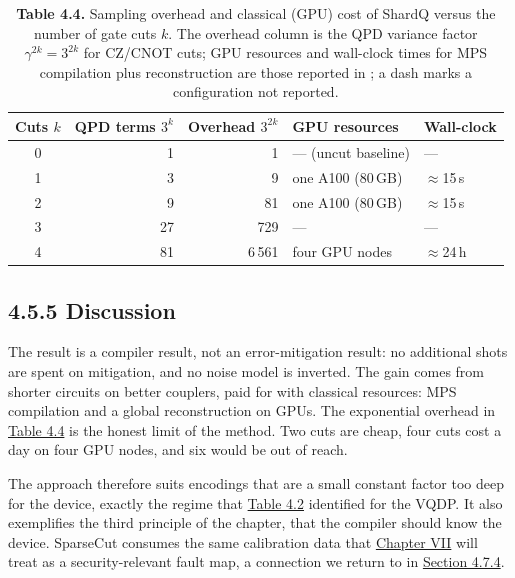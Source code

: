 \documentclass{report}
\theoremstyle{plain}
\theoremstyle{definition}
\theoremstyle{remark}
\begin{document}
\begin{table}[htbp]
\caption{\textbf{Table 4.4.} Sampling overhead and classical (GPU) cost of ShardQ versus the number of gate cuts $k$. The overhead column is the QPD variance factor $\gamma^{2k} = 3^{2k}$ for CZ/CNOT cuts; GPU resources and wall-clock times for MPS compilation plus reconstruction are those reported in \cite{guo2025shardq}; a dash marks a configuration not reported.}\label{tab:qml:shardq-overhead}
 
\small
\begin{tabular}{crrll}
\toprule
Cuts $k$ & QPD terms $3^{k}$ & Overhead $3^{2k}$ & GPU resources & Wall-clock \\
\midrule
0 & 1 & 1 & --- (uncut baseline) & --- \\
1 & 3 & 9 & one A100 (80 GB) & $\approx$15 s \\
2 & 9 & 81 & one A100 (80 GB) & $\approx$15 s \\
3 & 27 & 729 & --- & --- \\
4 & 81 & 6\,561 & four GPU nodes & $\approx$24 h \\
\bottomrule
\end{tabular}
\end{table}

\subsection{4.5.5 Discussion}\label{sec:qml:shardq:discussion}

The result is a compiler result, not an error-mitigation result: no additional shots are spent on mitigation, and no noise model is inverted. The gain comes from shorter circuits on better couplers, paid for with classical resources: MPS compilation and a global reconstruction on GPUs. The exponential overhead in \hyperref[tab:qml:shardq-overhead]{Table 4.4} is the honest limit of the method. Two cuts are cheap, four cuts cost a day on four GPU nodes, and six would be out of reach.

The approach therefore suits encodings that are a small constant factor too deep for the device, exactly the regime that \hyperref[tab:qml:vqt-hw]{Table 4.2} identified for the VQDP. It also exemplifies the third principle of the chapter, that the compiler should know the device. SparseCut consumes the same calibration data that \hyperref[ch:qec]{Chapter VII} will treat as a security-relevant fault map, a connection we return to in \hyperref[sec:qml:synthesis:bridges]{Section 4.7.4}.
\end{document}
